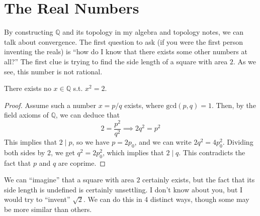 \section{The Real Numbers}

  By constructing $\mathbb{Q}$ and its topology in my algebra and topology notes, we can talk about convergence. The first question to ask (if you were the first person inventing the reals) is ``how do I know that there exists some other numbers at all?'' The first clue is trying to find the side length of a square with area $2$. As we see, this number is not rational. 

  \begin{theorem}
    \label{thm:sqrt2-irrational}
    There exists no $x \in \mathbb{Q}$ s.t. $x^2 = 2$. 
  \end{theorem}
  \begin{proof}
    Assume such a number $x = p/q$ exists, where $\mathrm{gcd}(p, q) = 1$. Then, by the field axioms of $\mathbb{Q}$, we can deduce that 
    \begin{equation}
      2 = \frac{p^2}{q^2} \implies 2 q^2 = p^2
    \end{equation}
    This implies that $2 \mid p$, so we have $p = 2p_0$, and we can write $2 q^2 = 4 p_0^2$. Dividing both sides by $2$, we get $q^2 = 2p_0^2$, which implies that $2 \mid q$. This contradicts the fact that $p$ and $q$ are coprime. 
  \end{proof} 

  We can ``imagine'' that a square with area $2$ certainly exists, but the fact that its side length is undefined is certainly unsettling. I don't know about you, but I would try to ``invent'' $\sqrt{2}$. We can do this in 4 distinct ways, though some may be more similar than others. 

